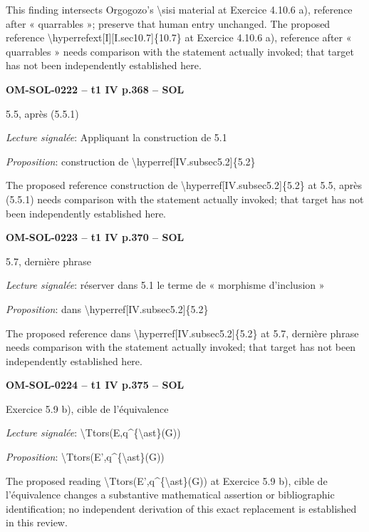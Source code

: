 This finding intersects Orgogozo's \textbackslash{}sisi material at Exercice 4.10.6 a), reference after « quarrables »; preserve that human entry unchanged. The proposed reference \textbackslash{}hyperrefext[I][I.sec10.7]\{10.7\} at Exercice 4.10.6 a), reference after « quarrables » needs comparison with the statement actually invoked; that target has not been independently established here.\par
\par\noindent\textbf{OM-SOL-0222 -- t1 IV p.368 -- SOL}\par
5.5, après (5.5.1)\par
\emph{Lecture signalée}: Appliquant la construction de 5.1\par
\emph{Proposition}: construction de \textbackslash{}hyperref[IV.subsec5.2]\{5.2\}\par
The proposed reference construction de \textbackslash{}hyperref[IV.subsec5.2]\{5.2\} at 5.5, après (5.5.1) needs comparison with the statement actually invoked; that target has not been independently established here.\par
\par\noindent\textbf{OM-SOL-0223 -- t1 IV p.370 -- SOL}\par
5.7, dernière phrase\par
\emph{Lecture signalée}: réserver dans 5.1 le terme de « morphisme d'inclusion »\par
\emph{Proposition}: dans \textbackslash{}hyperref[IV.subsec5.2]\{5.2\}\par
The proposed reference dans \textbackslash{}hyperref[IV.subsec5.2]\{5.2\} at 5.7, dernière phrase needs comparison with the statement actually invoked; that target has not been independently established here.\par
\par\noindent\textbf{OM-SOL-0224 -- t1 IV p.375 -- SOL}\par
Exercice 5.9 b), cible de l'équivalence\par
\emph{Lecture signalée}: \textbackslash{}Ttors(E,q\textasciicircum{}\{\textbackslash{}ast\}(G))\par
\emph{Proposition}: \textbackslash{}Ttors(E',q\textasciicircum{}\{\textbackslash{}ast\}(G))\par
The proposed reading \textbackslash{}Ttors(E',q\textasciicircum{}\{\textbackslash{}ast\}(G)) at Exercice 5.9 b), cible de l'équivalence changes a substantive mathematical assertion or bibliographic identification; no independent derivation of this exact replacement is established in this review.\par
